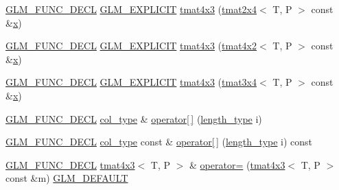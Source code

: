 \begin{DoxyCompactItemize}
\item 
\mbox{\hyperlink{setup_8hpp_ab2d052de21a70539923e9bcbf6e83a51}{G\+L\+M\+\_\+\+F\+U\+N\+C\+\_\+\+D\+E\+CL}} \mbox{\hyperlink{setup_8hpp_a6c74f5a5e7b134ab69023ff9a30d4d5d}{G\+L\+M\+\_\+\+E\+X\+P\+L\+I\+C\+IT}} \mbox{\hyperlink{structglm_1_1tmat4x3_a7c76da17513ed772c8b7ebf778fd881f}{tmat4x3}} (\mbox{\hyperlink{structglm_1_1tmat2x4}{tmat2x4}}$<$ T, P $>$ const \&\mbox{\hyperlink{glad_8h_a92d0386e5c19fb81ea88c9f99644ab1d}{x}})
\item 
\mbox{\hyperlink{setup_8hpp_ab2d052de21a70539923e9bcbf6e83a51}{G\+L\+M\+\_\+\+F\+U\+N\+C\+\_\+\+D\+E\+CL}} \mbox{\hyperlink{setup_8hpp_a6c74f5a5e7b134ab69023ff9a30d4d5d}{G\+L\+M\+\_\+\+E\+X\+P\+L\+I\+C\+IT}} \mbox{\hyperlink{structglm_1_1tmat4x3_adfbc5c5490e4bd2606d1c20fd76cd3b2}{tmat4x3}} (\mbox{\hyperlink{structglm_1_1tmat4x2}{tmat4x2}}$<$ T, P $>$ const \&\mbox{\hyperlink{glad_8h_a92d0386e5c19fb81ea88c9f99644ab1d}{x}})
\item 
\mbox{\hyperlink{setup_8hpp_ab2d052de21a70539923e9bcbf6e83a51}{G\+L\+M\+\_\+\+F\+U\+N\+C\+\_\+\+D\+E\+CL}} \mbox{\hyperlink{setup_8hpp_a6c74f5a5e7b134ab69023ff9a30d4d5d}{G\+L\+M\+\_\+\+E\+X\+P\+L\+I\+C\+IT}} \mbox{\hyperlink{structglm_1_1tmat4x3_a61edf2edf20cb9f6b6a977aa041d5f19}{tmat4x3}} (\mbox{\hyperlink{structglm_1_1tmat3x4}{tmat3x4}}$<$ T, P $>$ const \&\mbox{\hyperlink{glad_8h_a92d0386e5c19fb81ea88c9f99644ab1d}{x}})
\item 
\mbox{\hyperlink{setup_8hpp_ab2d052de21a70539923e9bcbf6e83a51}{G\+L\+M\+\_\+\+F\+U\+N\+C\+\_\+\+D\+E\+CL}} \mbox{\hyperlink{structglm_1_1tmat4x3_ac64f78f27c32014f7d72233969526430}{col\+\_\+type}} \& \mbox{\hyperlink{structglm_1_1tmat4x3_a079c5c89aa4fb8235e738b1b4db13fc3}{operator\mbox{[}$\,$\mbox{]}}} (\mbox{\hyperlink{structglm_1_1tmat4x3_a2f1ac502cc552a921a905e8a858fb1d7}{length\+\_\+type}} i)
\item 
\mbox{\hyperlink{setup_8hpp_ab2d052de21a70539923e9bcbf6e83a51}{G\+L\+M\+\_\+\+F\+U\+N\+C\+\_\+\+D\+E\+CL}} \mbox{\hyperlink{structglm_1_1tmat4x3_ac64f78f27c32014f7d72233969526430}{col\+\_\+type}} const  \& \mbox{\hyperlink{structglm_1_1tmat4x3_a7068a5dce773217a0bc7b44558790285}{operator\mbox{[}$\,$\mbox{]}}} (\mbox{\hyperlink{structglm_1_1tmat4x3_a2f1ac502cc552a921a905e8a858fb1d7}{length\+\_\+type}} i) const
\item 
\mbox{\hyperlink{setup_8hpp_ab2d052de21a70539923e9bcbf6e83a51}{G\+L\+M\+\_\+\+F\+U\+N\+C\+\_\+\+D\+E\+CL}} \mbox{\hyperlink{structglm_1_1tmat4x3}{tmat4x3}}$<$ T, P $>$ \& \mbox{\hyperlink{structglm_1_1tmat4x3_aec1ec9625bd7a013f5349c873a5040a9}{operator=}} (\mbox{\hyperlink{structglm_1_1tmat4x3}{tmat4x3}}$<$ T, P $>$ const \&m) \mbox{\hyperlink{setup_8hpp_aefce7051c376a64ba89fa93a9f63bc2c}{G\+L\+M\+\_\+\+D\+E\+F\+A\+U\+LT}}

\end{DoxyCompactItemize}
